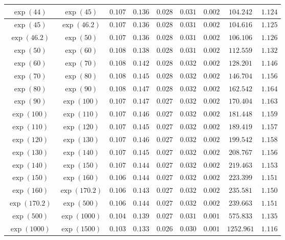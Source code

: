 \documentclass[reqno]{amsart}
\numberwithin{equation}{section}
\theoremstyle{remark}
\begin{document}
\begin{table}[h]
\begin{tabular}{|c|c|c|c|c|c|c|c|c|}
\hline
$\exp(44)$ & $\exp(45)$ & $0.107$ & $0.136$& $0.028$& $0.031$& $0.002$& $104.242$& $1.124$ \\
\hline
$\exp(45)$ & $\exp(46.2)$ & $0.107$ & $0.136$& $0.028$& $0.031$& $0.002$& $104.616$& $1.125$ \\
\hline
$\exp(46.2)$ & $\exp(50)$ &  $0.107 $ & $0.136 $ & $0.028 $& $0.031$ & $0.002$ & $ 106.106$ & $1.126$\\
\hline
$\exp(50)$ & $\exp(60)$ & $0.108 $ & $0.138 $ & $0.028 $& $0.031$ & $0.002$ & $112.559$ & $1.132$\\
\hline
$\exp(60)$ & $\exp(70)$ & $0.108 $ & $0.142 $ & $0.028 $& $0.032$ & $0.002$ & $128.201$ & $1.146$\\
\hline
$\exp(70)$ & $\exp(80)$ & $0.108 $ & $0.145 $ & $0.028 $& $0.032$ & $0.002$ & $146.704$ & $1.156$\\
\hline
$\exp(80)$ & $\exp(90)$ & $0.108 $ & $0.147 $ & $0.028 $& $0.032$ & $0.002$ & $162.542$ & $1.164$\\
\hline
$\exp(90)$ & $\exp(100)$ & $0.107 $ & $0.147 $ & $0.027 $& $0.032$ & $0.002$ & $170.404$ & $1.163$\\
\hline
$\exp(100)$ & $\exp(110)$ & $0.107 $ & $0.146 $ & $0.027 $& $0.032$ & $0.002$ & $ 181.448$ & $1.159$\\
\hline
$\exp(110)$ & $\exp(120)$ & $0.107 $ & $0.145 $ & $0.027 $& $0.032$ & $0.002$ & $189.419$ & $1.157$\\
\hline
$\exp(120)$ & $\exp(130)$ & $0.107 $ & $0.146 $ & $0.027 $& $0.032$ & $0.002$ & $199.542$ & $1.158$\\
\hline
$\exp(130)$ & $\exp(140)$ & $0.107$ & $0.145$ & $0.027$ & $0.032$ & $0.002$ & $208.767$ & $1.156$\\
\hline
$\exp(140)$ & $\exp(150)$ & $0.107$ & $0.144$ & $0.027$ & $0.032$ & $0.002$ & $219.463$ & $1.153$\\
\hline
$\exp(150)$ & $\exp(160)$ & $0.106$ & $0.144$ & $0.027$ & $0.032$ & $0.002$ & $223.399$ & $1.151$\\
\hline
$\exp(160)$ & $\exp(170.2)$ & $0.106$ & $0.143$ & $0.027$ & $0.032$ & $0.002$ & $235.581$ & $1.150$\\
\hline
$\exp(170.2)$ & $\exp(500)$ & $0.106$ & $0.144$ & $0.027$ & $0.032$ & $0.002$ & $239.663$ & $1.151$\\
\hline
$\exp(500)$ & $\exp(1000)$ & $0.104$ & $0.139$ & $0.027$ & $0.031$ & $0.001$ & $575.833$ & $1.135$\\
\hline
$\exp(1000)$ & $\exp(1500)$ & $0.103$ & $0.133$ & $0.026$ & $0.030$ & $0.001$ & $ 1252.961$ & $1.116$\\

\end{tabular}
\end{table}
\end{document}
